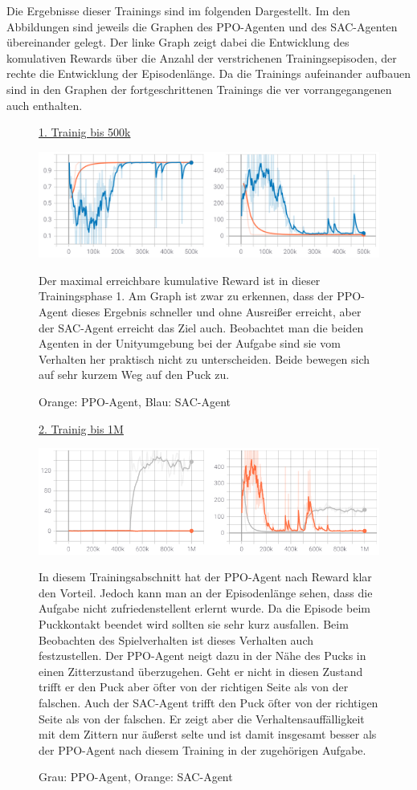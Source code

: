 Die Ergebnisse dieser Trainings sind im folgenden Dargestellt. Im den Abbildungen sind jeweils die Graphen des PPO-Agenten und des SAC-Agenten übereinander gelegt. Der linke Graph zeigt dabei die Entwicklung des komulativen Rewards über die Anzahl der verstrichenen Trainingsepisoden, der rechte die Entwicklung der Episodenlänge. Da die Trainings aufeinander aufbauen sind in den Graphen der fortgeschrittenen Trainings die ver vorrangegangenen auch enthalten.\\
\begin{figure} [h]
\underline{1. Trainig bis 500k} 

\includegraphics[width=\textwidth]{images/reaching_erg}
\label{unity_agent}
\caption{Orange: PPO-Agent, Blau: SAC-Agent}


Der maximal erreichbare kumulative Reward ist in dieser Trainingsphase 1. Am Graph ist zwar zu erkennen, dass der PPO-Agent dieses Ergebnis schneller und ohne Ausreißer erreicht, aber der SAC-Agent erreicht das Ziel auch. Beobachtet man die beiden Agenten in der Unityumgebung bei der Aufgabe sind sie vom Verhalten her praktisch nicht zu unterscheiden. Beide bewegen sich auf sehr kurzem Weg auf den Puck zu.
\end{figure}
\begin{figure} [h]
\underline{2. Trainig bis 1M} 

\includegraphics[width=\textwidth]{images/rea2_erg}
\label{unity_agent}
\caption{Grau: PPO-Agent, Orange: SAC-Agent}


In diesem Trainingsabschnitt hat der PPO-Agent nach Reward klar den Vorteil. Jedoch kann man an der Episodenlänge sehen, dass die Aufgabe nicht zufriedenstellent erlernt wurde. Da die Episode beim Puckkontakt beendet wird sollten sie sehr kurz ausfallen. Beim Beobachten des Spielverhalten ist dieses Verhalten auch festzustellen. Der PPO-Agent neigt dazu in der Nähe des Pucks in einen Zitterzustand überzugehen. Geht er nicht in diesen Zustand trifft er den Puck aber öfter von der richtigen Seite als von der falschen. Auch der SAC-Agent trifft den Puck öfter von der richtigen Seite als von der falschen. Er zeigt  aber die Verhaltensauffälligkeit mit dem Zittern nur äußerst selte und ist damit insgesamt besser als der PPO-Agent nach diesem Training in der zugehörigen Aufgabe.
\end{figure}
